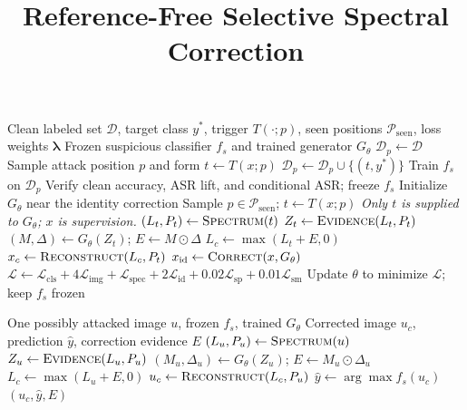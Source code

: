 \documentclass[conference]{IEEEtran}
\title{Reference-Free Selective Spectral Correction}
\author{\IEEEauthorblockN{Algorithm Preview}}
\begin{document}
\maketitle

\begin{algorithm}[t]
\caption{Training the suspicious classifier and correction generator}
\label{alg:train-reference-free-defense}
\begin{algorithmic}[1]
\Require Clean labeled set $\mathcal{D}$, target class $y^*$, trigger
$T(\cdot;p)$, seen positions $\mathcal{P}_{\mathrm{seen}}$, loss weights
$\boldsymbol{\lambda}$
\Ensure Frozen suspicious classifier $f_s$ and trained generator $G_\theta$
\State $\mathcal{D}_p \gets \mathcal{D}$
    \State Sample attack position $p$ and form $t\gets T(x;p)$
    \State $\mathcal{D}_p\gets\mathcal{D}_p\cup\{(t,y^*)\}$
\EndFor
\State Train $f_s$ on $\mathcal{D}_p$
\State Verify clean accuracy, ASR lift, and conditional ASR; freeze $f_s$
\State Initialize $G_\theta$ near the identity correction
        \State Sample $p\in\mathcal{P}_{\mathrm{seen}}$; $t\gets T(x;p)$
        \Statex \emph{Only $t$ is supplied to $G_\theta$; $x$ is supervision.}
        \State $(L_t,P_t)\gets\Call{Spectrum}{t}$
        \State $Z_t\gets\Call{Evidence}{L_t,P_t}$
        \State $(M,\Delta)\gets G_\theta(Z_t)$; $E\gets M\odot\Delta$
        \State $L_c\gets\max(L_t+E,0)$
        \State $x_c\gets\Call{Reconstruct}{L_c,P_t}$
        \State $x_{\mathrm{id}}\gets\Call{Correct}{x,G_\theta}$
        \State $\mathcal{L}\gets\mathcal{L}_{\mathrm{cls}}+4\mathcal{L}_{\mathrm{img}}
        +\mathcal{L}_{\mathrm{spec}}+2\mathcal{L}_{\mathrm{id}}
        +0.02\mathcal{L}_{\mathrm{sp}}+0.01\mathcal{L}_{\mathrm{sm}}$
        \State Update $\theta$ to minimize $\mathcal{L}$; keep $f_s$ frozen
    \EndFor
\EndFor
\end{algorithmic}
\end{algorithm}

\begin{algorithm}[t]
\caption{Reference-free correction of one inference image}
\label{alg:infer-reference-free-defense}
\begin{algorithmic}[1]
\Require One possibly attacked image $u$, frozen $f_s$, trained $G_\theta$
\Ensure Corrected image $u_c$, prediction $\hat y$, correction evidence $E$
\State $(L_u,P_u)\gets\Call{Spectrum}{u}$
\State $Z_u\gets\Call{Evidence}{L_u,P_u}$
\State $(M_u,\Delta_u)\gets G_\theta(Z_u)$; $E\gets M_u\odot\Delta_u$
\State $L_c\gets\max(L_u+E,0)$
\State $u_c\gets\Call{Reconstruct}{L_c,P_u}$
\State $\hat y\gets\arg\max f_s(u_c)$
\State \Return $(u_c,\hat y,E)$
\end{algorithmic}
\end{algorithm}
\end{document}
